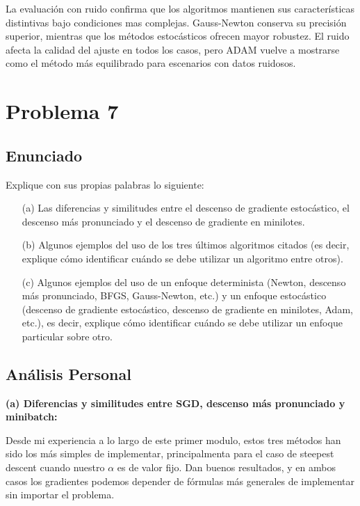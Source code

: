 \documentclass{article}
\begin{document}
La evaluación con ruido confirma que los algoritmos mantienen sus características distintivas bajo condiciones mas complejas. Gauss-Newton conserva su precisión superior, mientras que los métodos estocásticos ofrecen mayor robustez. El ruido afecta la calidad del ajuste en todos los casos, pero ADAM vuelve a mostrarse como el método más equilibrado para escenarios con datos ruidosos.

\section{Problema 7}

\subsection{Enunciado}

Explique con sus propias palabras lo siguiente:

\begin{itemize}
    \item[(a)] Las diferencias y similitudes entre el descenso de gradiente estocástico, el descenso más pronunciado y el descenso de gradiente en minilotes.
    \item[(b)] Algunos ejemplos del uso de los tres últimos algoritmos citados (es decir, explique cómo identificar cuándo se debe utilizar un algoritmo entre otros).
    \item[(c)] Algunos ejemplos del uso de un enfoque determinista (Newton, descenso más pronunciado, BFGS, Gauss-Newton, etc.) y un enfoque estocástico (descenso de gradiente estocástico, descenso de gradiente en minilotes, Adam, etc.), es decir, explique cómo identificar cuándo se debe utilizar un enfoque particular sobre otro.

\end{itemize}

\subsection{Análisis Personal}

\textbf{(a) Diferencias y similitudes entre SGD, descenso más pronunciado y minibatch:}

Desde mi experiencia a lo largo de este primer modulo, estos tres métodos han sido los más simples de implementar, principalmenta para el caso de steepest descent cuando nuestro $\alpha$ es de valor fijo. Dan buenos resultados, y en ambos casos los gradientes podemos depender de fórmulas más generales de implementar sin importar el problema.
\end{document}

